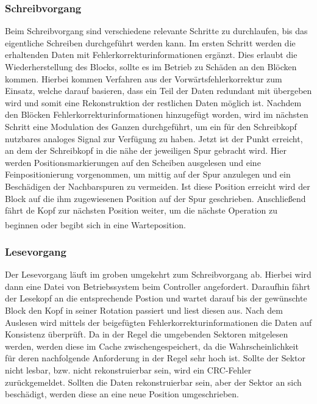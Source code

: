 \documentclass[a4paper, DIV20, 12pt, headsepline, parskip, flushleft]{scrartcl}
\begin{document}
\subsubsection{Schreibvorgang}
Beim Schreibvorgang sind verschiedene relevante Schritte zu durchlaufen, bis das eigentliche Schreiben durchgeführt werden kann. Im ersten Schritt werden die erhaltenden Daten mit Fehlerkorrekturinformationen ergänzt. Dies erlaubt die Wiederherstellung des Blocks, sollte es im Betrieb zu Schäden an den Blöcken kommen.
Hierbei kommen Verfahren aus der Vorwärtsfehlerkorrektur zum Einsatz, welche darauf basieren, dass ein Teil der Daten redundant mit übergeben wird und somit eine Rekonstruktion der restlichen Daten möglich ist. \newline
Nachdem den Blöcken Fehlerkorrekturinformationen hinzugefügt worden, wird im nächsten Schritt eine Modulation des Ganzen durchgeführt, um ein für den Schreibkopf nutzbares analoges Signal zur Verfügung zu haben.
Jetzt ist der Punkt erreicht, an dem der Schreibkopf in die nähe der jeweiligen Spur gebracht wird. Hier werden Positionsmarkierungen auf den Scheiben ausgelesen und eine Feinpositionierung vorgenommen, um mittig auf der Spur anzulegen und ein Beschädigen der Nachbarspuren zu vermeiden. Ist diese Position erreicht wird der Block auf die ihm zugewiesenen Position auf der Spur geschrieben. Anschließend fährt de Kopf zur nächsten Position weiter, um die nächste Operation zu beginnen oder begibt sich in eine Warteposition.\textsuperscript{\cite{lpbus} \cite{hdd}}
\subsubsection{Lesevorgang}
Der Lesevorgang läuft im groben umgekehrt zum Schreibvorgang ab.
Hierbei wird dann eine Datei von Betriebssystem beim Controller angefordert. Daraufhin fährt der Lesekopf an die entsprechende Postion und wartet darauf bis der gewünschte Block den Kopf in seiner Rotation passiert und liest diesen aus. Nach dem Auslesen wird mittels der beigefügten Fehlerkorrekturinformationen die Daten auf Konsistenz überprüft. Da in der Regel die umgebenden Sektoren mitgelesen werden, werden diese im Cache zwischengespeichert, da die Wahrscheinlichkeit für deren nachfolgende Anforderung in der Regel sehr hoch ist.\newline
Sollte der Sektor nicht lesbar, bzw. nicht rekonstruierbar sein, wird ein CRC-Fehler zurückgemeldet. Sollten die Daten rekonstruierbar sein, aber der Sektor an sich beschädigt, werden diese an eine neue Position umgeschrieben.
\end{document}
